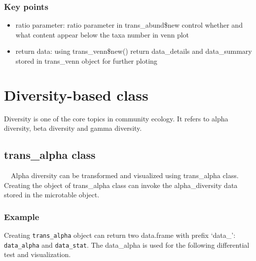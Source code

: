 \documentclass[
]{book}
\newenvironment{Shaded}{\begin{snugshade}}{\end{snugshade}}
\newcommand{\AttributeTok}[1]{\textcolor[rgb]{0.77,0.63,0.00}{#1}}
\newcommand{\CommentTok}[1]{\textcolor[rgb]{0.56,0.35,0.01}{\textit{#1}}}
\newcommand{\FunctionTok}[1]{\textcolor[rgb]{0.00,0.00,0.00}{#1}}
\newcommand{\NormalTok}[1]{#1}
\newcommand{\OtherTok}[1]{\textcolor[rgb]{0.56,0.35,0.01}{#1}}
\newcommand{\SpecialCharTok}[1]{\textcolor[rgb]{0.00,0.00,0.00}{#1}}
\newcommand{\StringTok}[1]{\textcolor[rgb]{0.31,0.60,0.02}{#1}}
\providecommand{\tightlist}{%
  \setlength{\itemsep}{0pt}\setlength{\parskip}{0pt}}
\begin{document}
\hypertarget{key-points-2}{%
\subsection{Key points}\label{key-points-2}}

\begin{itemize}
\tightlist
\item
  ratio parameter: ratio parameter in trans\_abund\$new control whether and what content appear below the taxa number in venn plot
\item
  return data: using trans\_venn\$new() return data\_details and data\_summary stored in trans\_venn object for further ploting
\end{itemize}

\hypertarget{diversity-based-class}{%
\chapter{Diversity-based class}\label{diversity-based-class}}

Diversity is one of the core topics in community ecology.
It refers to alpha diversity, beta diversity and gamma diversity.

\hypertarget{trans_alpha-class}{%
\section{trans\_alpha class}\label{trans_alpha-class}}

　Alpha diversity can be transformed and visualized using trans\_alpha class.
Creating the object of trans\_alpha class can invoke the alpha\_diversity data stored in the microtable object.

\hypertarget{example-2}{%
\subsection{Example}\label{example-2}}

Creating \texttt{trans\_alpha} object can return two data.frame with prefix `data\_': \texttt{data\_alpha} and \texttt{data\_stat}.
The data\_alpha is used for the following differential test and visualization.

\begin{Shaded}
\end{Shaded}
\end{document}
